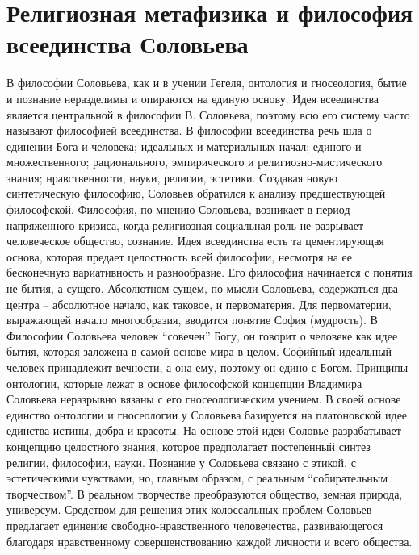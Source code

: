 \documentclass[12pt]{article}
\begin{document}
\section{Религиозная метафизика и философия всеединства Соловьева}
В философии Соловьева, как и в учении Гегеля, онтология и гносеология, бытие и познание неразделимы и
опираются на единую основу. 
Идея всеединства является центральной в философии В. Соловьева, поэтому всю его систему часто называют
философией всеединства.
В философии всеединства речь шла о единении Бога и человека; идеальных и материальных начал; единого и
множественного; рационального, эмпирического и религиозно-мистического знания; нравственности, науки,
религии, эстетики.
Создавая новую синтетическую философию, Соловьев обратился к анализу предшествующей философской.
Философия, по мнению Соловьева, возникает в период напряженного кризиса, когда религиозная социальная
роль не разрывает человеческое общество, сознание. Идея всеединства есть та цементирующая основа, которая
предает целостность всей философии, несмотря на ее бесконечную вариативность и разнообразие.
Его  философия  начинается  с  понятия  не  бытия,  а  сущего.  Абсолютном  сущем,  по  мысли  Соловьева,
содержаться два центра – абсолютное начало, как таковое, и первоматерия. Для первоматерии, выражающей
начало многообразия, вводится понятие София (мудрость). В Философии Соловьева человек “совечен” Богу, он
говорит о человеке как идее бытия, которая заложена в самой основе мира в целом. Софийный идеальный
человек принадлежит вечности, а она ему, поэтому он едино с Богом. 
Принципы  онтологии,  которые  лежат  в  основе  философской  концепции  Владимира  Соловьева  неразрывно
вязаны  с  его  гносеологическим  учением.  В  своей  основе  единство  онтологии  и  гносеологии  у  Соловьева
базируется  на  платоновской  идее  единства  истины,  добра  и  красоты.  На  основе  этой  идеи  Соловье
разрабатывает концепцию целостного знания, которое предполагает постепенный синтез религии, философии,
науки.
Познание  у  Соловьева  связано  с  этикой,  с  эстетическими  чувствами,  но,  главным  образом,  с  реальным
“собирательным творчеством”. В реальном творчестве преобразуются общество, земная природа, универсум.
Средством для решения этих колоссальных проблем Соловьев предлагает единение свободно-нравственного
человечества,  развивающегося  благодаря  нравственному  совершенствованию  каждой  личности  и  всего
общества.


\newpage
\end{document}
